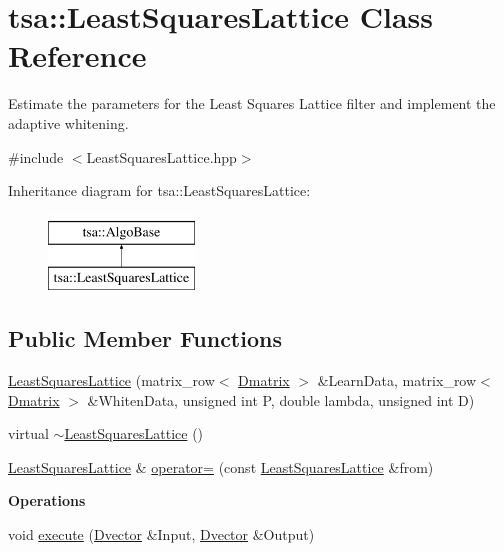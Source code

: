 \hypertarget{classtsa_1_1_least_squares_lattice}{}\section{tsa\+:\+:Least\+Squares\+Lattice Class Reference}
\label{classtsa_1_1_least_squares_lattice}


Estimate the parameters for the Least Squares Lattice filter and implement the adaptive whitening.  




{\ttfamily \#include $<$Least\+Squares\+Lattice.\+hpp$>$}

Inheritance diagram for tsa\+:\+:Least\+Squares\+Lattice\+:\begin{figure}[H]
\begin{center}
\leavevmode
\includegraphics[height=2.000000cm]{classtsa_1_1_least_squares_lattice}
\end{center}
\end{figure}
\subsection*{Public Member Functions}
\begin{DoxyCompactItemize}
\item 
\hyperlink{classtsa_1_1_least_squares_lattice_a0fa6ec81a0438b15892c2dbc49932ea0}{Least\+Squares\+Lattice} (matrix\+\_\+row$<$ \hyperlink{namespacetsa_ad260cd21c1891c4ed391fe788569aba4}{Dmatrix} $>$ \&Learn\+Data, matrix\+\_\+row$<$ \hyperlink{namespacetsa_ad260cd21c1891c4ed391fe788569aba4}{Dmatrix} $>$ \&Whiten\+Data, unsigned int P, double lambda, unsigned int D)
\item 
virtual \hyperlink{classtsa_1_1_least_squares_lattice_a9a83bde1203dadf87892afcf25729081}{$\sim$\+Least\+Squares\+Lattice} ()
\item 
\hyperlink{classtsa_1_1_least_squares_lattice}{Least\+Squares\+Lattice} \& \hyperlink{classtsa_1_1_least_squares_lattice_a7037938b899e80b09bb34c053d1c7f41}{operator=} (const \hyperlink{classtsa_1_1_least_squares_lattice}{Least\+Squares\+Lattice} \&from)
\end{DoxyCompactItemize}
\begin{Indent}\textbf{ Operations}\par
\begin{DoxyCompactItemize}
\item 
void \hyperlink{classtsa_1_1_least_squares_lattice_a768ad13ebc89f33b627cc04e5131f7b4}{execute} (\hyperlink{namespacetsa_a8900fb03d849baf447a1a0efe2561fb2}{Dvector} \&Input, \hyperlink{namespacetsa_a8900fb03d849baf447a1a0efe2561fb2}{Dvector} \&Output)
\end{DoxyCompactItemize}
\end{Indent}
